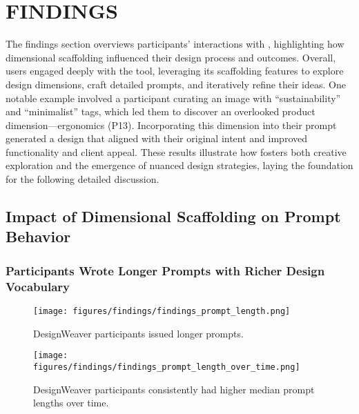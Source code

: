 \section{FINDINGS}
The findings section overviews participants’ interactions with \toolname{}, highlighting how dimensional scaffolding influenced their design process and outcomes. Overall, users engaged deeply with the tool, leveraging its scaffolding features to explore design dimensions, craft detailed prompts, and iteratively refine their ideas. One notable example involved a participant curating an image with “sustainability” and “minimalist” tags, which led them to discover an overlooked product dimension—ergonomics (P13). Incorporating this dimension into their prompt generated a design that aligned with their original intent and improved functionality and client appeal. These results illustrate how \toolname{} fosters both creative exploration and the emergence of nuanced design strategies, laying the foundation for the following detailed discussion.

\subsection{Impact of Dimensional Scaffolding on Prompt Behavior}
\label{finding6.1:naunced_prompt}
\subsubsection{\toolname{} Participants Wrote Longer Prompts with Richer Design Vocabulary}

\begin{figure}[htbp]
    \centering
    \texttt{[image: figures/findings/findings\_prompt\_length.png]}
    \caption{DesignWeaver participants issued longer prompts.}
    \label{fig:findings_prompt_length}
\end{figure}

\begin{figure}[htbp]
    \centering
    \texttt{[image: figures/findings/findings\_prompt\_length\_over\_time.png]}
    \caption{DesignWeaver participants consistently had higher median prompt lengths over time.}
    \label{fig:findings_prompt_length_over_time}
\end{figure}

